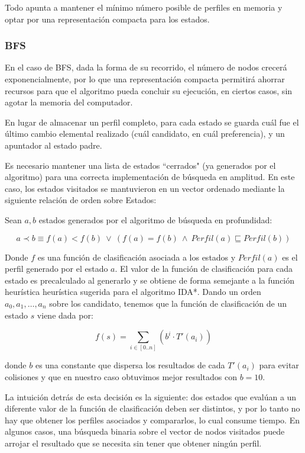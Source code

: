 \documentclass[letterpaper,12pt, titlepage]{article}
\begin{document}
Todo apunta a mantener el mínimo número posible de perfiles en
memoria y optar por una representación compacta para los estados.

\subsubsection*{BFS}

En el caso de BFS, dada la forma de su recorrido, el número de
nodos crecerá exponencialmente, por lo que una representación
compacta permitirá ahorrar recursos para que el algoritmo pueda
concluir su ejecución, en ciertos casos, sin agotar la memoria
del computador.

En lugar de almacenar un perfil completo, para cada estado
se guarda cuál fue el último cambio elemental realizado (cuál
candidato, en cuál preferencia), y un apuntador al estado padre.

Es necesario mantener una lista de estados ``cerrados" (ya
generados por el algoritmo) para una correcta implementación
de búsqueda en amplitud. En este caso, los estados visitados
se mantuvieron en un vector ordenado mediante la siguiente
relación de orden sobre Estados:

Sean $a, b$ estados generados por el algoritmo de búsqueda en
profundidad:

$$a \prec b \equiv f(a) < f(b) \ \vee \ (f(a) = f(b) \ \wedge \ Perfil(a) \sqsubseteq Perfil(b))$$

Donde $f$ es una función de clasificación asociada a los
estados y $Perfil(a)$ es el perfil generado por el estado
$a$. El valor de la función de clasificación para cada estado 
es precalculado al generarlo y se obtiene de forma semejante
a la función heurística heurística sugerida para el algoritmo
IDA*. Dando un orden $a_0, a_1, \ldots, a_n$ sobre los candidato,
tenemos que la función de clasificación de un estado $s$ viene
dada por:

$$\displaystyle f(s) = \sum_{i\in [0..n]} (b^i\cdot T'(a_i))$$

\hspace*{-0.5cm}donde $b$ es una constante que dispersa los
resultados de cada $T'(a_i)$ para evitar colisiones y que en
nuestro caso obtuvimos mejor resultados con $b=10$.

\bigskip
La intuición detrás de esta decisión es la siguiente:
dos estados que evalúan a un diferente valor de la función de clasificación
deben ser distintos, y por lo tanto no hay que obtener los perfiles asociados
y compararlos, lo cual consume tiempo. En algunos casos, una búsqueda binaria
sobre el vector de nodos visitados puede arrojar el resultado que se necesita
sin tener que obtener ningún perfil.
\end{document}
